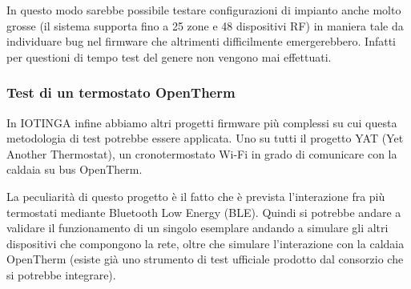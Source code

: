 \documentclass[a4paper,titlepage]{article}
\begin{document}
In questo modo sarebbe possibile testare configurazioni di impianto anche molto
grosse (il sistema supporta fino a 25 zone e 48 dispositivi RF) in maniera tale da
individuare bug nel firmware che altrimenti difficilmente emergerebbero. Infatti per
questioni di tempo test del genere non vengono mai effettuati.

\subsubsection{Test di un termostato OpenTherm}

In IOTINGA infine abbiamo altri progetti firmware più complessi su cui questa metodologia
di test potrebbe essere applicata. Uno su tutti il progetto YAT (Yet Another Thermostat),
un cronotermostato Wi-Fi in grado di comunicare con la caldaia su bus OpenTherm.

La peculiarità di questo progetto è il fatto che è prevista l'interazione fra più
termostati mediante Bluetooth Low Energy (BLE). Quindi si potrebbe andare a validare
il funzionamento di un singolo esemplare andando a simulare gli altri dispositivi
che compongono la rete, oltre che simulare l'interazione con la caldaia OpenTherm
(esiste già uno strumento di test ufficiale prodotto dal consorzio che si potrebbe
integrare).
\end{document}
